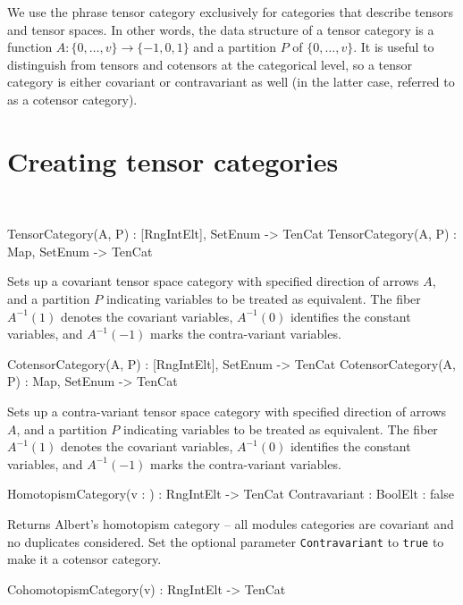 We use the phrase tensor category exclusively for categories that describe tensors and tensor spaces.
In other words, the data structure of a tensor category is a function 
$A:\{0,\dots,v\}\rightarrow \{-1,0,1\}$ and a partition $P$ of $\{0,\dots,v\}$.
It is useful to distinguish from tensors and cotensors at the categorical level,
so a tensor category is either covariant or contravariant as well 
(in the latter case, referred to as a cotensor category).

\section{Creating tensor categories}~

\begin{intrinsics}
TensorCategory(A, P) : [RngIntElt], {SetEnum} -> TenCat
TensorCategory(A, P) : Map, {SetEnum} -> TenCat
\end{intrinsics}

Sets up a covariant tensor space category with specified direction of
arrows $A$, and a partition $P$ indicating variables to be treated as
equivalent.  The fiber $A^{-1}(1)$ denotes the covariant variables,
$A^{-1}(0)$ identifies the constant variables, and $A^{-1}(-1)$ marks
the contra-variant variables.  

\begin{intrinsics}
CotensorCategory(A, P) : [RngIntElt], {SetEnum} -> TenCat
CotensorCategory(A, P) : Map, {SetEnum} -> TenCat
\end{intrinsics}

Sets up a contra-variant tensor space category with specified direction of
arrows $A$, and a partition $P$ indicating variables to be treated as
equivalent.  The fiber $A^{-1}(1)$ denotes the covariant variables,
$A^{-1}(0)$ identifies the constant variables, and $A^{-1}(-1)$ marks
the contra-variant variables.  

\begin{intrinsics}
HomotopismCategory(v : \parameters) : RngIntElt -> TenCat
Contravariant : BoolElt : false
\end{intrinsics}

Returns Albert's homotopism category -- all modules categories are covariant 
and 
no duplicates considered.
Set the optional parameter {\tt Contravariant} to {\tt true} to make it a cotensor category.

\begin{intrinsics}
CohomotopismCategory(v) : RngIntElt -> TenCat
\end{intrinsics}

